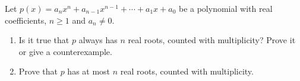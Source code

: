 Let $p(x)=a_nx^n+a_{n-1}x^{n-1}+\cdots+a_1x+a_0$ be a polynomial with real coefficients, $n\ge1$ and $a_n\ne0$.
\begin{enumerate}
\item[(a)] Is it true that $p$ always has $n$ real roots, counted with multiplicity? Prove it or give a counterexample.
\item[(b)] Prove that $p$ has at most $n$ real roots, counted with multiplicity.
\end{enumerate}

